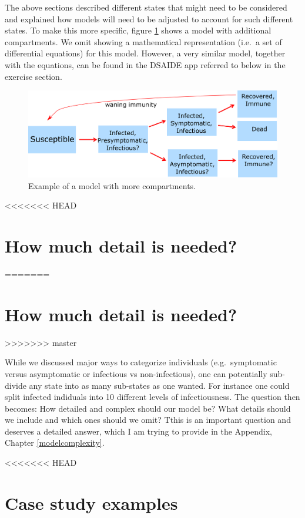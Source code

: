 \documentclass[]{book}
\theoremstyle{definition}
\theoremstyle{definition}
\theoremstyle{definition}
\theoremstyle{remark}
\begin{document}
The above sections described different states that might need to be
considered and explained how models will need to be adjusted to account
for such different states. To make this more specific, figure
\ref{fig:complicatedmodel} shows a model with additional compartments.
We omit showing a mathematical representation (i.e.~a set of
differential equations) for this model. However, a very similar model,
together with the equations, can be found in the DSAIDE app referred to
below in the exercise section.

\begin{figure}
\centering
\includegraphics{./images/ComplicatedModel.png}
\caption{\label{fig:complicatedmodel}Example of a model with more
compartments.}
\end{figure}

<<<<<<< HEAD
\hypertarget{how-much-detail-is-needed}{%
\section{How much detail is needed?}\label{how-much-detail-is-needed}}
=======
\section{How much detail is needed?}\label{how-much-detail-is-needed}
>>>>>>> master

While we discussed major ways to categorize individuals
(e.g.~symptomatic versus asymptomatic or infectious vs non-infectious),
one can potentially sub-divide any state into as many sub-states as one
wanted. For instance one could split infected indiduals into 10
different levels of infectiousness. The question then becomes: How
detailed and complex should our model be? What details should we include
and which ones should we omit? Tthis is an important question and
deserves a detailed answer, which I am trying to provide in the
Appendix, Chapter \ref{modelcomplexity}.

<<<<<<< HEAD
\hypertarget{case-study-examples}{%
\section{Case study examples}\label{case-study-examples}}
\end{document}
